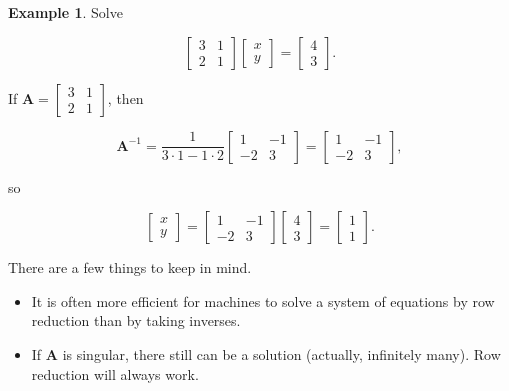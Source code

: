 \documentclass[
]{book}
\theoremstyle{definition}
\theoremstyle{definition}
\newtheorem{example}{Example}[chapter]
\theoremstyle{definition}
\theoremstyle{definition}
\theoremstyle{remark}
\begin{document}
\begin{examplebox}

\begin{example}
Solve

\[\begin{bmatrix}3&1\\2&1\end{bmatrix}\begin{bmatrix}x\\y\end{bmatrix}=\begin{bmatrix}4\\3\end{bmatrix}.\]

If \(\mathbf{A}=\begin{bmatrix}3&1\\2&1\end{bmatrix}\), then

\[\mathbf{A}^{-1}=\frac{1}{3\cdot 1-1\cdot 2}\begin{bmatrix}1 & -1\\-2 & 3\end{bmatrix}=\begin{bmatrix}1 & -1\\-2 & 3\end{bmatrix},\]

so

\[\begin{bmatrix}x\\y\end{bmatrix}=\begin{bmatrix}1 & -1\\-2 & 3\end{bmatrix}\begin{bmatrix}4\\3\end{bmatrix}=\begin{bmatrix}1\\1\end{bmatrix}.\]
\end{example}

\end{examplebox}

There are a few things to keep in mind.

\begin{itemize}
\item
  It is often more efficient for machines to solve a system of equations by row reduction than by taking inverses.
\item
  If \(\mathbf{A}\) is singular, there still can be a solution (actually, infinitely many). Row reduction will always work.
\end{itemize}
\end{document}
